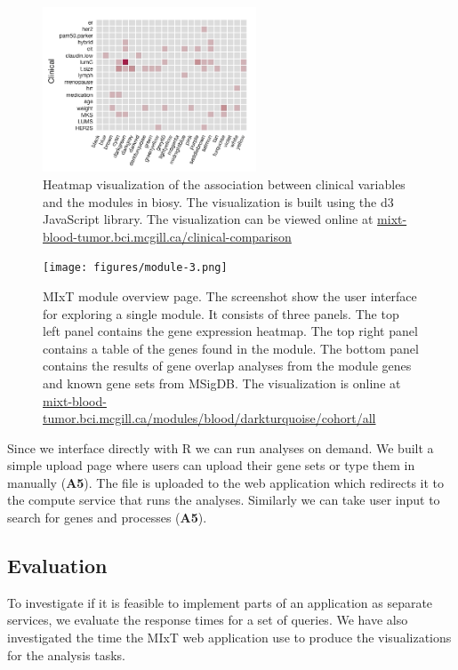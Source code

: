 \begin{figure}[h!]
\centering
\includegraphics[width=2.5in]{figures/clinical-comp.png}
\caption{Heatmap visualization of the association between clinical variables and
the modules in biosy.  The visualization is built using the d3 JavaScript
library. The visualization can be viewed online at
\url{mixt-blood-tumor.bci.mcgill.ca/clinical-comparison}} 
\label{fig_second_case}
\end{figure} 


\begin{figure}[h!]
\centering
\texttt{[image: figures/module-3.png]}
\caption{MIxT module overview page. The screenshot show the user interface for
exploring a single module. It consists of three panels. The top left panel
contains the gene expression heatmap. The top right panel contains a table of
the genes found in the module. The bottom panel contains the results of gene
overlap analyses from the module genes and known gene sets from MSigDB. The
visualization is online at
\url{mixt-blood-tumor.bci.mcgill.ca/modules/blood/darkturquoise/cohort/all}}
\label{fig_first_case}
\end{figure} 

Since we interface directly with R we can run analyses on demand. We built a
simple upload page where users can upload their gene sets or type them in
manually (\textbf{A5}). The file is uploaded to the web application which
redirects it to the compute service that runs the analyses. Similarly we can
take user input to search for genes and processes (\textbf{A5}).


\subsection*{Evaluation} 
To investigate if it is feasible to implement parts of an application as
separate services, we evaluate the response times for a set of queries. We have
also investigated the time the MIxT web application use to produce the
visualizations for the analysis tasks. 

